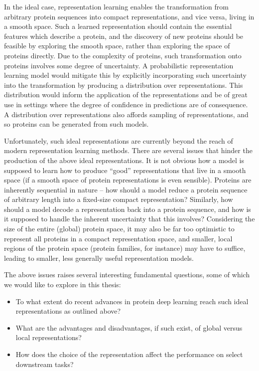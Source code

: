 In the ideal case, representation learning enables the transformation from arbitrary protein sequences into compact representations, and vice versa, living in a smooth space. Such a learned representation should contain the essential features which describe a protein, and the discovery of new proteins should be feasible by exploring the smooth space, rather than exploring the space of proteins directly. Due to the complexity of proteins, such transformation onto proteins involves some degree of uncertainty. A probabilistic representation learning model would mitigate this by explicitly incorporating such uncertainty into the transformation by producing a distribution over representations. This distribution would inform the application of the representations and be of great use in settings where the degree of confidence in predictions are of consequence. A distribution over representations also affords sampling of representations, and so proteins can be generated from such models.

Unfortunately, such ideal representations are currently beyond the reach of modern representation learning methods. There are several issues that hinder the production of the above ideal representations. It is not obvious how a model is supposed to learn how to produce ``good'' representations that live in a smooth space (if a smooth space of protein representations is even sensible). Proteins are inherently sequential in nature -- how should a model reduce a protein sequence of arbitrary length into a fixed-size compact representation? Similarly, how should a model decode a representation back into a protein sequence, and how is it supposed to handle the inherent uncertainty that this involves? Considering the size of the entire (global) protein space, it may also be far too optimistic to represent all proteins in a compact representation space, and smaller, local regions of the protein space (protein families, for instance) may have to suffice, leading to smaller, less generally useful representation models.

The above issues raises several interesting fundamental questions, some of which  we would like to explore in this thesis:
\begin{itemize}
    \item To what extent do recent advances in protein deep learning reach such ideal representations as outlined above?
    \item What are the advantages and disadvantages, if such exist, of global versus local representations?
    \item How does the choice of the representation affect the performance on select downstream tasks?
\end{itemize}

